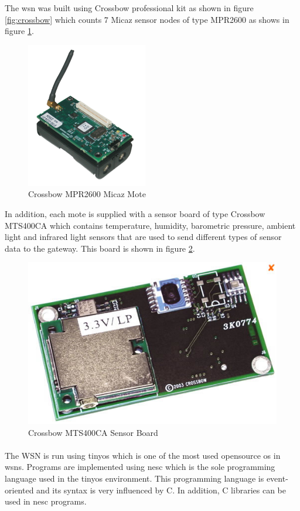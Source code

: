 \documentclass[oneside,12pt,a4paper,final]{book}
\begin{document}
The \gls{wsn} was built using Crossbow professional kit as shown in figure \ref{fig:crossbow} which counts 7 Micaz sensor nodes of type MPR2600 as shows in figure \ref{fig:micaz}.
\begin{figure}[htbp]
\centering
\includegraphics[scale=0.8]{img/micaz.png}
\caption{Crossbow MPR2600 Micaz Mote}
\label{fig:micaz}
\end{figure}

In addition, each mote is supplied with a sensor board of type Crossbow MTS400CA which contains temperature, humidity, barometric pressure, ambient light and infrared light sensors that are used to send different types of sensor data to the gateway. This board is shown in figure \ref{fig:mts400}.

\begin{figure}[htbp]
\centering
\includegraphics[scale=0.5]{img/mts400ca.jpg}
\caption{Crossbow MTS400CA Sensor Board}
\label{fig:mts400}
\end{figure}
\paragraph{}
The WSN is run using \gls{tinyos} which is one of the most used opensource \gls{os} in \glspl{wsn}. Programs are implemented using \gls{nesc} which is the sole programming language used in the \gls{tinyos} environment. This programming language is event-oriented and its syntax is very influenced by C. In addition, C libraries can be used in \gls{nesc} programs.
\end{document}
